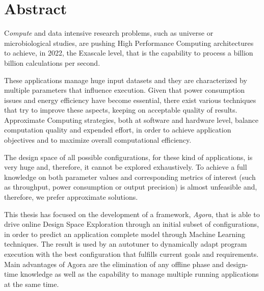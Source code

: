 \chapter*{Abstract}

\lettrine{C}{}\textit{ompute} and data intensive research problems, such as universe or microbiological studies, are pushing High Performance Computing architectures to achieve, in 2022, the Exascale level, that is the capability to process a billion billion calculations per second.

These applications manage huge input datasets and they are characterized by multiple parameters that influence execution. Given that power consumption issues and energy efficiency have become essential, there exist various techniques that try to improve these aspects, keeping on acceptable quality of results. Approximate Computing strategies, both at software and hardware level, balance computation quality and expended effort, in order to achieve application objectives and to maximize overall computational efficiency.

The design space of all possible configurations, for these kind of applications, is very huge and, therefore, it cannot be explored exhaustively. To achieve a full knowledge on both parameter values and corresponding metrics of interest (such as throughput, power consumption or output precision) is almost unfeasible and, therefore, we prefer approximate solutions.

This thesis has focused on the development of a framework, \textit{Agora}, that is able to drive online Design Space Exploration through an initial subset of configurations, in order to predict an application complete model through Machine Learning techniques. The result is used by an autotuner to dynamically adapt program execution with the best configuration that fulfills current goals and requirements. Main advantages of Agora are the elimination of any offline phase and design-time knowledge as well as the capability to manage multiple running applications at the same time.
